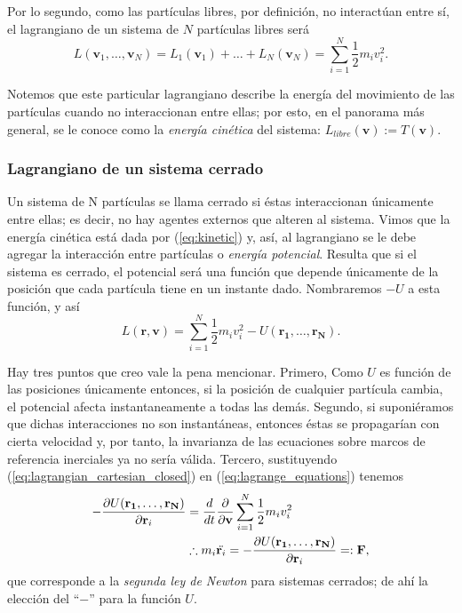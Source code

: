 Por lo segundo, como las partículas libres, por definición, no interactúan entre sí, el lagrangiano de un sistema de $N$ partículas libres será
\begin{equation}
 L(\mathbf{v}_1, \ldots, \mathbf{v}_N) = L_1(\mathbf{v}_1) + \ldots + L_N(\mathbf{v}_N) = \sum_{i=1}^N \frac{1}{2}m_i v_i^2.
 \label{eq:kinetic}
\end{equation}

Notemos que este particular lagrangiano describe la energía del movimiento de las partículas cuando no interaccionan entre ellas; por esto, en el panorama más general, se le conoce como la \textit{energía cinética} del sistema: $L_{libre}(\mathbf{v}) := T(\mathbf{v})$.

\subsubsection{Lagrangiano de un sistema cerrado} 

Un sistema de N partículas se llama cerrado si éstas interaccionan únicamente entre ellas; es decir, no hay agentes externos que alteren al sistema. Vimos que la energía cinética está dada por (\ref{eq:kinetic}) y, así, al lagrangiano se le debe agregar la interacción entre partículas o \textit{energía potencial}. Resulta que si el sistema es cerrado, el potencial será una función que depende únicamente de la posición que cada partícula tiene en un instante dado. Nombraremos $-U$ a esta función, y así
\begin{equation}
 L(\mathbf{r},\mathbf{v}) = \sum_{i=1}^N \frac{1}{2}m_i v_i^2 -U(\mathbf{r_1},\ldots,\mathbf{r_N}).
 \label{eq:lagrangian_cartesian_closed}
\end{equation} 

Hay tres puntos que creo vale la pena mencionar. Primero, Como $U$ es función de las posiciones únicamente entonces, si la posición de cualquier partícula cambia, el potencial  afecta instantaneamente a todas las demás. Segundo, si suponiéramos que dichas interacciones no son instantáneas, entonces éstas se propagarían con cierta velocidad y, por tanto, la invarianza de las ecuaciones sobre marcos de referencia inerciales ya no sería válida. Tercero, sustituyendo (\ref{eq:lagrangian_cartesian_closed}) en (\ref{eq:lagrange_equations}) tenemos
\begin{align}
 -\frac{\partial U(\mathbf{r_1}, \ldots, \mathbf{r_N})}{\partial \mathbf{r}_i} &= \frac{d}{dt} \frac{\partial }{\partial \mathbf{v}} \sum_{i=1}^N \frac{1}{2}m_i v_i^2 \nonumber \\
 &\therefore m_i \ddot{\mathbf{r}_i} = -\frac{\partial U(\mathbf{r_1}, \ldots, \mathbf{r_N})}{\partial \mathbf{r}_i} =: \mathbf{F},
 \label{eq:newton_second_law}
\end{align}
que corresponde a la \textit{segunda ley de Newton} para sistemas cerrados; de ahí la elección del ``$-$'' para la función $U$.